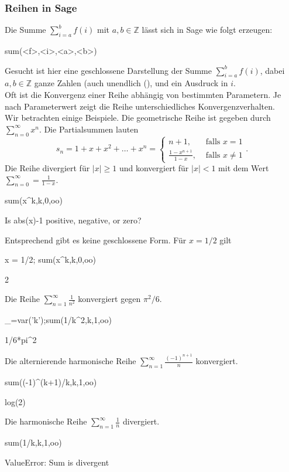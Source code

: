 \documentclass[fontsize=12pt,paper=a4,twoside,bibtotoc,idxtotoc,
liststotoc,pagesize,BCOR1.2cm,DIV15,chapterprefix,pagesize=pdftex]{scrbook}
\theoremstyle{plain}
\theoremstyle{definition}
\theoremstyle{remark}
\begin{document}
\subsubsection{Reihen in Sage}
Die Summe $\sum_{i=a}^b f(i)$ mit $a,b \in \mathbb{Z}$ lässt sich in Sage wie folgt erzeugen:
\begin{sagein}
sum(<f>,<i>,<a>,<b>) 
\end{sagein}
Gesucht ist hier eine geschlossene Darstellung der Summe $\sum_{i=a}^b f(i)$, dabei $a,b \in \mathbb{Z}$ ganze
Zahlen (auch unendlich (), und  ein Ausdruck in $i$.\\
Oft ist die Konvergenz einer Reihe abhängig von bestimmten Parametern. Je nach Parameterwert zeigt die Reihe
unterschiedliches Konvergenzverhalten.\\
Wir betrachten einige Beispiele.
Die geometrische Reihe ist gegeben durch $\sum_{n=0}^\infty x^n$. Die
Partialsummen lauten
\[ s_n=1+x+x^2+\ldots + x^n = \left \{ \begin{array}{ll}
n+1, & \mbox{ falls } x=1\\
\frac{1-x^{n+1}}{1-x}, & \mbox{ falls } x \neq 1 
\end{array} \right. .\]
Die Reihe divergiert für $|x|\geq1$ und konvergiert für $|x|<1$ mit
dem Wert $\sum_{n=0}^\infty = \frac{1}{1-x}$.
\begin{sagein}
sum(x^k,k,0,oo)
\end{sagein}
\begin{sage}
Is  abs(x)-1  positive, negative, or zero?
\end{sage}
Entsprechend gibt es keine geschlossene Form. Für $x=1/2$ gilt
\begin{sagein}
x = 1/2; sum(x^k,k,0,oo)
\end{sagein}
\begin{sage}
  2
\end{sage}
 Die Reihe $\sum_{n=1}^\infty \frac{1}{n^2}$ konvergiert gegen
$\pi^2/6$.
\begin{sagein}
_=var('k');sum(1/k^2,k,1,oo)
\end{sagein}
\begin{sage}
1/6*pi^2
\end{sage}
 Die alternierende harmonische Reihe  $\sum_{n=1}^\infty
\frac{(-1)^{n+1}}{n}$ konvergiert.
\begin{sagein}
sum((-1)^(k+1)/k,k,1,oo)
\end{sagein}
\begin{sage}
  log(2)
\end{sage}
 Die harmonische Reihe $\sum_{n=1}^\infty \frac{1}{n}$
 divergiert.
\begin{sagein}
sum(1/k,k,1,oo)
\end{sagein}
\begin{sage}
ValueError: Sum is divergent
\end{sage}
\end{document}
